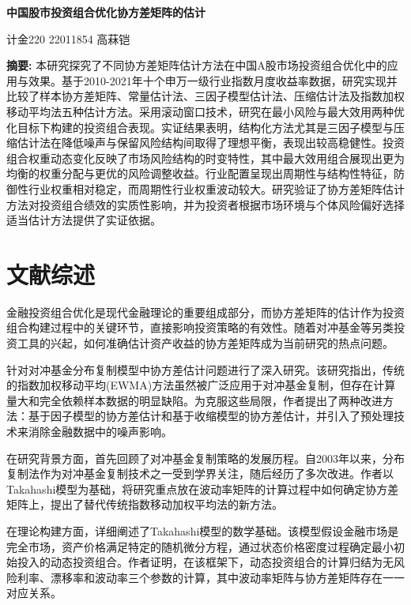\documentclass[12pt, a4paper]{article}
\begin{document}
\begin{center}
\LARGE\textbf{中国股市投资组合优化协方差矩阵的估计}

\vspace{1cm}
\large 计金220 22011854 高菻铠
\end{center}

\noindent \textbf{摘要:} 本研究探究了不同协方差矩阵估计方法在中国A股市场投资组合优化中的应用与效果。基于2010-2021年十个申万一级行业指数月度收益率数据，研究实现并比较了样本协方差矩阵、常量估计法、三因子模型估计法、压缩估计法及指数加权移动平均法五种估计方法。采用滚动窗口技术，研究在最小风险与最大效用两种优化目标下构建的投资组合表现。实证结果表明，结构化方法尤其是三因子模型与压缩估计法在降低噪声与保留风险结构间取得了理想平衡，表现出较高稳健性。投资组合权重动态变化反映了市场风险结构的时变特性，其中最大效用组合展现出更为均衡的权重分配与更优的风险调整收益。行业配置呈现出周期性与结构性特征，防御性行业权重相对稳定，而周期性行业权重波动较大。研究验证了协方差矩阵估计方法对投资组合绩效的实质性影响，并为投资者根据市场环境与个体风险偏好选择适当估计方法提供了实证依据。

\section{文献综述}

金融投资组合优化是现代金融理论的重要组成部分，而协方差矩阵的估计作为投资组合构建过程中的关键环节，直接影响投资策略的有效性。随着对冲基金等另类投资工具的兴起，如何准确估计资产收益的协方差矩阵成为当前研究的热点问题。

\citet{sun2019covariance}针对对冲基金分布复制模型中协方差估计问题进行了深入研究。该研究指出，传统的指数加权移动平均(EWMA)方法虽然被广泛应用于对冲基金复制，但存在计算量大和完全依赖样本数据的明显缺陷。为克服这些局限，作者提出了两种改进方法：基于因子模型的协方差估计和基于收缩模型的协方差估计，并引入了预处理技术来消除金融数据中的噪声影响。

在研究背景方面，\citet{sun2019covariance}首先回顾了对冲基金复制策略的发展历程。自2003年以来，分布复制法作为对冲基金复制技术之一受到学界关注，随后经历了多次改进。作者以Takahashi模型为基础，将研究重点放在波动率矩阵的计算过程中如何确定协方差矩阵上，提出了替代传统指数移动加权平均法的新方法。

在理论构建方面，\citet{sun2019covariance}详细阐述了Takahashi模型的数学基础。该模型假设金融市场是完全市场，资产价格满足特定的随机微分方程，通过状态价格密度过程确定最小初始投入的动态投资组合。作者证明，在该框架下，动态投资组合的计算归结为无风险利率、漂移率和波动率三个参数的计算，其中波动率矩阵与协方差矩阵存在一一对应关系。
\end{document}
